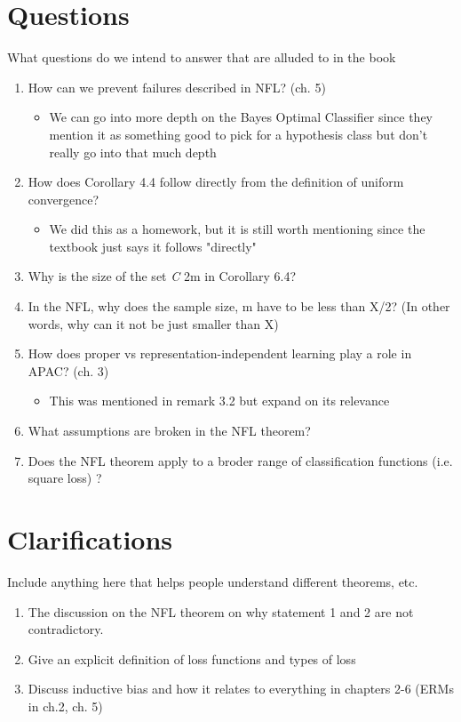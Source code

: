 \documentclass{article}
\begin{document}
\section{Questions}

What questions do we intend to answer that are alluded to in the book

\begin{enumerate}
\item How can we prevent failures described in NFL? (ch. 5) \begin{itemize}
    \item We can go into more depth on the Bayes Optimal Classifier since they mention it as something good to pick for a hypothesis class but don't really go into that much depth
\end{itemize}
\item How does Corollary 4.4 follow directly from the definition of uniform convergence?
\begin{itemize}
\item We did this as a homework, but it is still worth mentioning since the textbook just says it follows "directly"
\end{itemize}
\item Why is the size of the set \textit{C} 2m in Corollary 6.4?
\item In the NFL, why does the sample size, m have to be less than X/2? (In other words, why can it not be just smaller than X) 
\item How does proper vs representation-independent learning play a role in APAC? (ch. 3)
\begin{itemize}
\item This was mentioned in remark 3.2 but expand on its relevance
\end{itemize}

\item What assumptions are broken in the NFL theorem? 
\item Does the NFL theorem apply to a broder range of classification functions (i.e. square loss) ?
\end{enumerate}

\section{Clarifications}

Include anything here that helps people understand different theorems, etc. \\ 
\begin{enumerate}
\item The discussion on the NFL theorem on why statement 1 and 2 are not contradictory. 
\item Give an explicit definition of loss functions and types of loss
\item Discuss inductive bias and how it relates to everything in chapters 2-6 (ERMs in ch.2, ch. 5)


\end{enumerate} 
\end{document}

